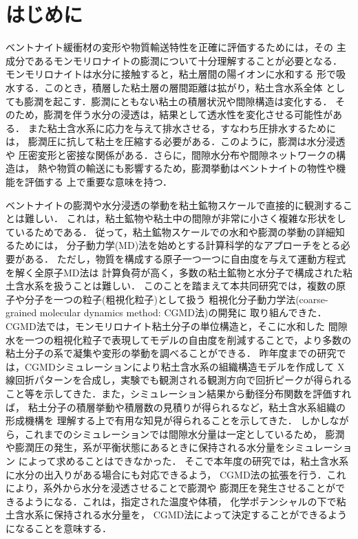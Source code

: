 \section{はじめに}
ベントナイト緩衝材の変形や物質輸送特性を正確に評価するためには，その
主成分であるモンモリロナイトの膨潤について十分理解することが必要となる．
モンモリロナイトは水分に接触すると，粘土層間の陽イオンに水和する
形で吸水する．このとき，積層した粘土層の層間距離は拡がり，粘土含水系全体
としても膨潤を起こす．膨潤にともない粘土の積層状況や間隙構造は変化する．
そのため，膨潤を伴う水分の浸透は，結果として透水性を変化させる可能性がある．
また粘土含水系に応力を与えて排水させる，すなわち圧排水するためには， 
膨潤圧に抗して粘土を圧縮する必要がある．このように，膨潤は水分浸透や
圧密変形と密接な関係がある．さらに，間隙水分布や間隙ネットワークの構造は，
熱や物質の輸送にも影響するため，膨潤挙動はベントナイトの物性や機能を評価する
上で重要な意味を持つ．

ベントナイトの膨潤や水分浸透の挙動を粘土鉱物スケールで直接的に観測することは難しい．
これは，粘土鉱物や粘土中の間隙が非常に小さく複雑な形状をしているためである．
従って，粘土鉱物スケールでの水和や膨潤の挙動の詳細知るためには，
分子動力学(MD)法を始めとする計算科学的なアプローチをとる必要がある．
ただし，物質を構成する原子一つ一つに自由度を与えて運動方程式を解く全原子MD法は
計算負荷が高く，多数の粘土鉱物と水分子で構成された粘土含水系を扱うことは難しい．
このことを踏まえて本共同研究では，複数の原子や分子を一つの粒子(粗視化粒子)として扱う
粗視化分子動力学法(coarse-grained molecular dynamics method: CGMD法)の開発に
取り組んできた．CGMD法では，モンモリロナイト粘土分子の単位構造と，そこに水和した
間隙水を一つの粗視化粒子で表現してモデルの自由度を削減することで，より多数の
粘土分子の系で凝集や変形の挙動を調べることができる．
昨年度までの研究では，CGMDシミュレーションにより粘土含水系の組織構造モデルを作成して
X線回折パターンを合成し，実験でも観測される観測方向で回折ピークが得られる
こと等を示してきた．また，シミュレーション結果から動径分布関数を評価すれば，
粘土分子の積層挙動や積層数の見積りが得られるなど，粘土含水系組織の形成機構を
理解する上で有用な知見が得られることを示してきた．
しかしながら，これまでのシミュレーションでは間隙水分量は一定としているため，
膨潤や膨潤圧の発生，系が平衡状態にあるときに保持される水分量をシミュレーション
によって求めることはできなかった．
そこで本年度の研究では，粘土含水系に水分の出入りがある場合にも対応できるよう，
CGMD法の拡張を行う．これにより，系外から水分を浸透させることで膨潤や
膨潤圧を発生させることができるようになる．これは，指定された温度や体積，
化学ポテンシャルの下で粘土含水系に保持される水分量を，
CGMD法によって決定することができるようになることを意味する．

